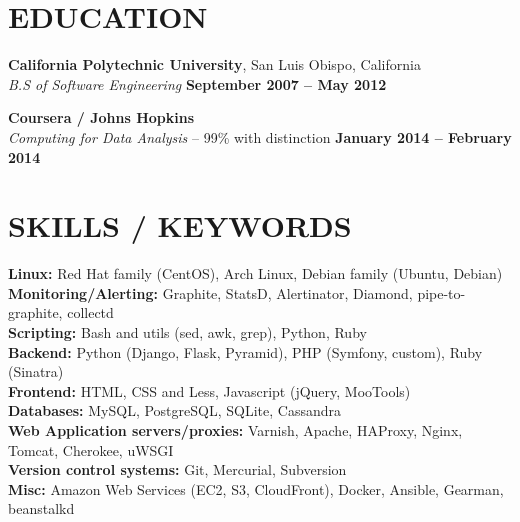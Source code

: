 \documentclass[margin,line]{resume}
\begin{document}
\begin{resume}
\sectionline

    \section{\mysidestyle \textbf{\large{E}\small{DUCATION}}}

    \textbf{\listing California Polytechnic University}, San Luis Obispo, California \vspace{1mm}\\
    \textsl{B.S of Software Engineering} \hfill \textbf{September 2007 -- May 2012}\vspace{-3mm}\\\vspace{-1mm}%

    \textbf{\listing Coursera / Johns Hopkins} \vspace{1mm}\\
    \textsl{Computing for Data Analysis} -- 99\% with distinction \hfill \textbf{January 2014 -- February 2014}\vspace{-3mm}\\\vspace{-1mm}%

    \vspace{-1mm}

\sectionline

    \section{\mysidestyle \textbf{\large{S}\small{KILLS} / \large{K}\small{EYWORDS}}}

    \textbf{Linux:} Red Hat family (CentOS), Arch Linux, Debian family (Ubuntu, Debian)\\
    \textbf{Monitoring/Alerting:} Graphite, StatsD, Alertinator, Diamond, pipe-to-graphite, collectd\\
    \textbf{Scripting:} Bash and utils (sed, awk, grep), Python, Ruby\\
    \textbf{Backend:} Python (Django, Flask, Pyramid), PHP (Symfony, custom), Ruby (Sinatra)\\
    \textbf{Frontend:} HTML, CSS and Less, Javascript (jQuery, MooTools)\\
    \textbf{Databases:} MySQL, PostgreSQL, SQLite, Cassandra\\
    \textbf{Web Application servers/proxies:} Varnish, Apache, HAProxy, Nginx, Tomcat, Cherokee, uWSGI\\
    \textbf{Version control systems:} Git, Mercurial, Subversion\\
    \textbf{Misc:} Amazon Web Services (EC2, S3, CloudFront), Docker, Ansible, Gearman, beanstalkd



\end{resume}
\end{document}
